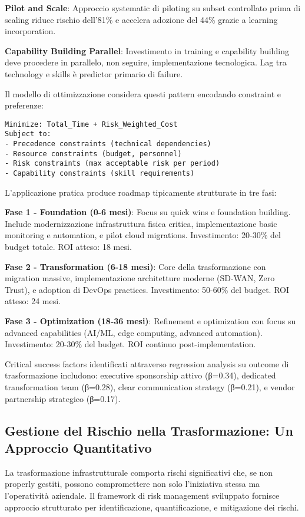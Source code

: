 \textbf{Pilot and Scale}: Approccio systematic di piloting su subset controllato prima di scaling riduce rischio dell'81\% e accelera adozione del 44\% grazie a learning incorporation.

\textbf{Capability Building Parallel}: Investimento in training e capability building deve procedere in parallelo, non seguire, implementazione tecnologica. Lag tra technology e skills è predictor primario di failure.

Il modello di ottimizzazione considera questi pattern encodando constraint e preferenze:

\begin{verbatim}
Minimize: Total_Time + Risk_Weighted_Cost
Subject to:
- Precedence constraints (technical dependencies)
- Resource constraints (budget, personnel)
- Risk constraints (max acceptable risk per period)
- Capability constraints (skill requirements)
\end{verbatim}

L'applicazione pratica produce roadmap tipicamente strutturate in tre fasi:

\textbf{Fase 1 - Foundation (0-6 mesi)}: Focus su quick wins e foundation building. Include modernizzazione infrastruttura fisica critica, implementazione basic monitoring e automation, e pilot cloud migrations. Investimento: 20-30\% del budget totale. ROI atteso: 18 mesi.

\textbf{Fase 2 - Transformation (6-18 mesi)}: Core della trasformazione con migration massive, implementazione architetture moderne (SD-WAN, Zero Trust), e adoption di DevOps practices. Investimento: 50-60\% del budget. ROI atteso: 24 mesi.

\textbf{Fase 3 - Optimization (18-36 mesi)}: Refinement e optimization con focus su advanced capabilities (AI/ML, edge computing, advanced automation). Investimento: 20-30\% del budget. ROI continuo post-implementation.

Critical success factors identificati attraverso regression analysis su outcome di trasformazione includono: executive sponsorship attivo (β=0.34), dedicated transformation team (β=0.28), clear communication strategy (β=0.21), e vendor partnership strategico (β=0.17).

\subsection{Gestione del Rischio nella Trasformazione: Un Approccio Quantitativo}

La trasformazione infrastrutturale comporta rischi significativi che, se non properly gestiti, possono compromettere non solo l'iniziativa stessa ma l'operatività aziendale. Il framework di risk management sviluppato fornisce approccio strutturato per identificazione, quantificazione, e mitigazione dei rischi.

